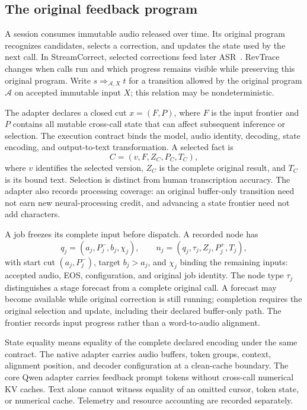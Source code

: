 \subsection{The original feedback program}
A session consumes immutable audio released over time. Its original
program recognizes candidates, selects a correction, and updates the
state used by the next call. In StreamCorrect, selected corrections feed
later ASR~\cite{vu2026streamcorrect}. RevTrace changes when calls run and
which progress remains visible while preserving this original program.
Write $s\mathrel{\Rightarrow_{\mathcal A,X}}t$ for a transition allowed
by the original program $\mathcal A$ on accepted immutable input $X$;
this relation may be nondeterministic.

The adapter declares a closed cut $x=(F,P)$, where $F$ is the input
frontier and $P$ contains all mutable cross-call state that can affect
subsequent inference or selection. The execution contract binds the
model, audio identity, decoding, state encoding, and output-to-text
transformation. A selected fact is
\begin{equation}
 C=(v,F,Z_C,P_C,T_C),
 \label{eq:canonical}
\end{equation}
where $v$ identifies the selected version, $Z_C$ is the complete original
result, and $T_C$ is its bound text. Selection is distinct from human
transcription accuracy. The adapter also records processing coverage:
an original buffer-only transition need not earn new neural-processing
credit, and advancing a state frontier need not add characters.

A job freezes its complete input before dispatch. A recorded node has
\begin{equation}
 q_j=(a_j,P_j^-,b_j,\chi_j),\qquad
 n_j=(q_j,\tau_j,Z_j,P_j^+,T_j),
 \label{eq:node}
\end{equation}
with start cut $(a_j,P_j^-)$, target $b_j>a_j$, and $\chi_j$ binding the
remaining inputs: accepted audio, EOS, configuration, and original job
identity. The node type $\tau_j$ distinguishes a stage forecast from a
complete original call. A forecast may become available while original
correction is still running; completion requires the original selection
and update, including their declared buffer-only path. The frontier
records input progress rather than a word-to-audio alignment.

State equality means equality of the complete declared encoding under
the same contract. The native adapter carries audio buffers, token
groups, context, alignment position, and decoder configuration at a
clean-cache boundary. The core Qwen adapter carries feedback prompt
tokens without cross-call numerical KV caches. Text alone cannot witness
equality of an omitted cursor, token state, or numerical cache. Telemetry
and resource accounting are recorded separately.

